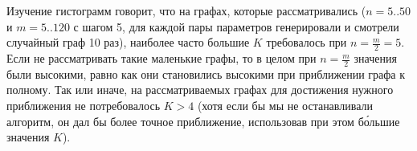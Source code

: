 \begin{figure}
\centering
{}
\qquad
{}
\qquad
{}
\qquad
{}
\caption{}
\end{figure}

Изучение гистограмм говорит, что на графах, которые рассматривались ($n=5..50$ и $m=5..120$ с шагом 5, для каждой пары параметров генерировали и смотрели случайный граф 10 раз), наиболее часто большие $K$ требовалось при $n = \frac{m}{2} = 5$. Если не рассматривать такие маленькие графы, то в целом при $n=\frac{m}{2}$ значения были высокими, равно как они становились высокими при приближении графа к полному. Так или иначе, на рассматриваемых графах для достижения нужного приближения не потребовалось $K > 4$ (хотя если бы мы не останавливали алгоритм, он дал бы более точное приближение, использовав при этом б\'{о}льшие значения $K$).

